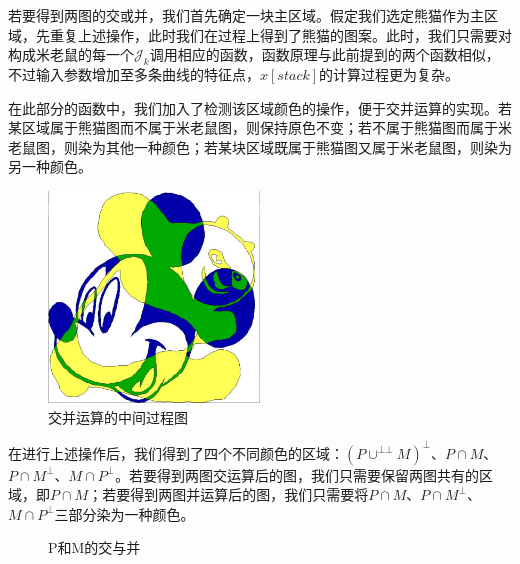 \documentclass{article}
\begin{document}
	若要得到两图的交或并，我们首先确定一块主区域。假定我们选定熊猫作为主区域，先重复上述操作，此时我们在过程上得到了熊猫的图案。此时，我们只需要对构成米老鼠的每一个$\mathcal{J}_k$调用相应的函数，函数原理与此前提到的两个函数相似，不过输入参数增加至多条曲线的特征点，$x[stack]$的计算过程更为复杂。

	在此部分的函数中，我们加入了检测该区域颜色的操作，便于交并运算的实现。若某区域属于熊猫图而不属于米老鼠图，则保持原色不变；若不属于熊猫图而属于米老鼠图，则染为其他一种颜色；若某块区域既属于熊猫图又属于米老鼠图，则染为另一种颜色。
	
	\begin{figure}[!h]
		\centering
		\includegraphics[width=0.5\textwidth]{P和M.jpg}
		\caption{交并运算的中间过程图}
	\end{figure}

	\newpage
	在进行上述操作后，我们得到了四个不同颜色的区域：$(P\cup^{\bot\bot} M)^{\bot}$、$P\cap M$、$P\cap M^{\bot}$、$M\cap P^{\bot}$。若要得到两图交运算后的图，我们只需要保留两图共有的区域，即$P\cap M$；若要得到两图并运算后的图，我们只需要将$P\cap M$、$P\cap M^{\bot}$、$M\cap P^{\bot}$三部分染为一种颜色。
	
	\begin{figure}[!h]
		\centering 
		\caption{P和M的交与并}
	\end{figure}
\end{document}
